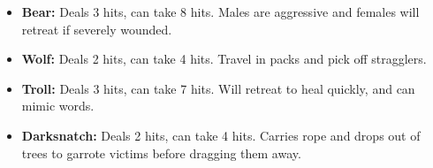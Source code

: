 \documentclass[a4paper]{article}
\begin{document}
\begin{multicols}{2}
\begin{itemize}
\item \textbf{Bear:} Deals 3 hits, can take 8 hits. Males are aggressive and females will retreat if severely wounded.
\item \textbf{Wolf: } Deals 2 hits, can take 4 hits. Travel in packs and pick off stragglers.
\item \textbf{Troll: } Deals 3 hits, can take 7 hits. Will retreat to heal quickly, and can mimic words.
\item \textbf{Darksnatch: } Deals 2 hits, can take 4 hits. Carries rope and drops out of trees to garrote victims before dragging them away. 
\end{itemize}



\end{multicols}
\end{document}
